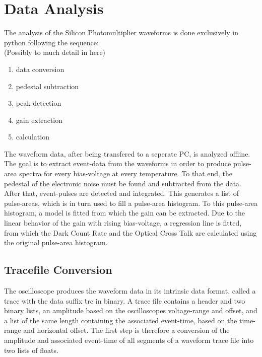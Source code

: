 \documentclass[12pt,article,type=msc,colorback,accentcolor=tud9c]{tudthesis}
\begin{document}

\clearpage

\section{\Large Data Analysis}
The analysis of the Silicon Photomultiplier waveforms is done exclusively in python following the sequence:\\
(Possibly to much detail in here)
\begin{enumerate}[topsep=0pt,itemsep=-1ex,partopsep=1ex,parsep=1ex]
\item data conversion
\item pedestal subtraction
\item peak detection
\item gain extraction
\item calculation
\end{enumerate}
The waveform data, after being transfered to a seperate PC, is analyzed offline. The goal is to extract event-data from the waveforms in order to produce pulse-area spectra for every bias-voltage at every temperature. To that end, the pedestal of the electronic noise must be found and subtracted from the data. After that, event-pulses are detected and integrated. This generates a list of pulse-areas, which is in turn used to fill a pulse-area histogram. To this pulse-area histogram, a model is fitted from which the gain can be extracted. Due to the linear behavior of the gain with rising bias-voltage, a regression line is fitted, from which the Dark Count Rate and the Optical Cross Talk are calculated using the original pulse-area histogram.
\subsection{Tracefile Conversion}
The oscilloscope produces the waveform data in its intrinsic data format, called a trace with the data suffix \.trc in binary. A trace file contains a header and two binary lists, an amplitude based on the oscilloscopes voltage-range and offset, and a list of the same length containing the associated event-time, based on the time-range and horizontal offset. The first step is therefore a conversion of the amplitude and associated event-time of all segments of a waveform trace file into two lists of floats. 
\clearpage
\end{document}
